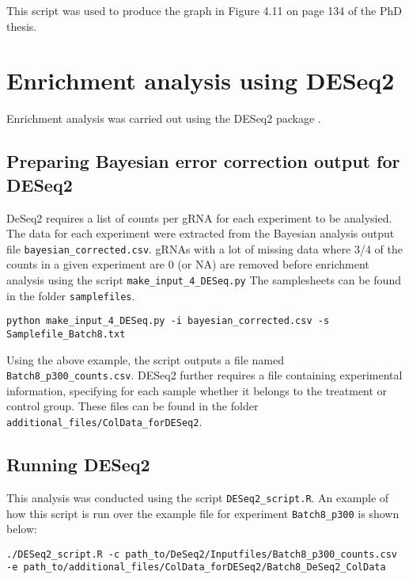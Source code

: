 This script was used to produce the graph in Figure 4.11 on page 134 of the PhD thesis.


\section{Enrichment analysis using DESeq2}

Enrichment analysis was carried out using the DESeq2 package \cite{Love:2014eo}.

\subsection{Preparing Bayesian error correction output for DESeq2}

DeSeq2 requires a list of counts per gRNA for each experiment to be analysied. The data for each experiment were extracted from the Bayesian analysis output file \verb|bayesian_corrected.csv|. gRNAs  with a  lot of missing data where 3/4 of the counts in a given experiment are 0 (or NA) are removed before enrichment analysis using the script \verb|make_input_4_DESeq.py| The samplesheets can be found in the folder \verb|samplefiles|.

\begin{small}\begin{lstlisting}
python make_input_4_DESeq.py -i bayesian_corrected.csv -s Samplefile_Batch8.txt
\end{lstlisting}\end{small}

Using the above example, the script outputs a file named \verb|Batch8_p300_counts.csv|.
DESeq2 further requires a file containing experimental information, specifying for each sample whether it belongs to the treatment or control group. These files can be found in the folder \verb|additional_files/ColData_forDESeq2|.

\subsection{Running DESeq2}

This analysis was conducted using the script \verb|DESeq2_script.R|. An example of how this script is run over the example file for experiment \verb|Batch8_p300|  is shown below:

\begin{small}\begin{lstlisting}
./DESeq2_script.R -c path_to/DeSeq2/Inputfiles/Batch8_p300_counts.csv -e path_to/additional_files/ColData_forDESeq2/Batch8_DeSeq2_ColData
\end{lstlisting}\end{small}

